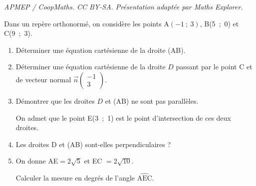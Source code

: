 \documentclass[10pt]{article}
\providecommand{\vect}[1]{\overrightarrow{#1}}
\begin{document}
\noindent\textit{APMEP / CoopMaths. CC BY-SA. Présentation adaptée par Maths Explorer.}\par\medskip
\medskip
Dans un repère orthonormé, on considère les points A$(-1~;~3)$, B(5~;~0) et C(9~;~3).

\medskip

\begin{enumerate}
\item Déterminer une équation cartésienne de la droite (AB).
\item Déterminer une équation cartésienne de la droite $D$ passant par le point C et de vecteur normal $\vect{n}\begin{pmatrix}-1\\3\end{pmatrix}$.
\item Démontrer que les droites $D$ et (AB) ne sont pas parallèles.

On admet que le point E(3~;~1) est le point d'intersection de ces deux droites.
\item Les droites D et (AB) sont-elles perpendiculaires ?
\item On donne AE$= 2\sqrt{5}$ et EC $= 2\sqrt{10}$.

Calculer la mesure en degrés de l'angle $\widehat{\text{AEC}}$.
\end{enumerate}

\bigskip
\end{document}
